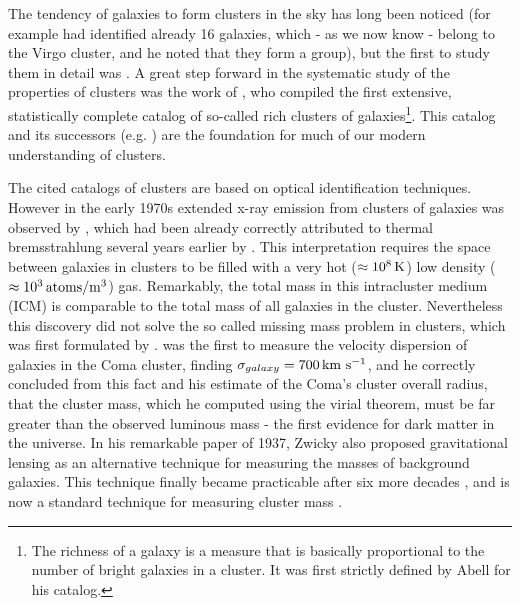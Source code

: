 The tendency of galaxies to form clusters in the sky has long been noticed (for
example \citet{Messier1784} had identified already 16 galaxies, which - as we
now know - belong to the Virgo cluster, and he noted that they form a
group), but
the first to study them in detail was \citet{Wolf1906}. A great step forward in
the systematic study of the properties of clusters was the work of
\citet{Abell1958}, who compiled the first extensive, statistically complete
catalog of so-called rich clusters of galaxies\footnote{The richness of a galaxy
is a measure that is basically proportional to the number of bright galaxies in
a cluster. It was first strictly defined by Abell for his catalog.}. This
catalog and its successors (e.g. \citet{Abell1989}) are the foundation for much
of our modern understanding of clusters.   

The cited catalogs of clusters are based on optical identification techniques.
However in the early 1970s extended x-ray emission from clusters of galaxies
was observed by \citet{Gursky1971, Kellogg1972}, which had been already
correctly attributed to thermal
bremsstrahlung several years earlier by \citet{Felten1966}. This interpretation
requires
the space between galaxies in clusters to be filled with a very hot 
($\approx \unit[10^8]{K}$) low density ($\approx \unit[10^3]{atoms/m^3}$) gas.
Remarkably, the total mass in this intracluster medium (ICM) is comparable to
the total mass of all galaxies in the cluster. Nevertheless this discovery did
not solve the so called missing mass problem in clusters, which was first
formulated by \citet{Zwicky1933,Zwicky1937}. \citet{Zwicky1933} was the first
to measure the velocity dispersion of galaxies in the Coma cluster, finding
$\sigma_{galaxy}=\unit[700]{km\ s^{-1}}$, and he correctly concluded from this
fact and his estimate of the Coma's cluster overall radius, that the cluster
mass, which he computed using the virial theorem, must be far greater than the
observed luminous mass - the first evidence for dark matter in the universe. In
his remarkable paper of 1937, Zwicky also proposed gravitational lensing as an
alternative technique for measuring the masses of background galaxies. This
technique finally became practicable after six more decades \citep{Tyson1990},
and is now a standard technique for measuring cluster mass
\citep{Bartelmann2003}.

